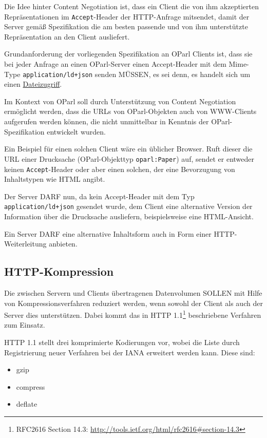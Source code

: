 \documentclass[,a4paper]{article}
\begin{document}
Die Idee hinter Content Negotiation ist, dass ein Client die von ihm
akzeptierten Repräsentationen im \texttt{Accept}-Header der HTTP-Anfrage
mitsendet, damit der Server gemäß Spezifikation die am besten passende
und von ihm unterstützte Repräsentation an den Client ausliefert.

Grundanforderung der vorliegenden Spezifikation an OParl Clients ist,
dass sie bei jeder Anfrage an einen OParl-Server einen Accept-Header mit
dem Mime-Type \texttt{application/ld+json} senden MÜSSEN, es sei denn,
es handelt sich um einen \hyperref[dateizugriff]{Dateizugriff}.

Im Kontext von OParl soll durch Unterstützung von Content Negotiation
ermöglicht werden, dass die URLs von OParl-Objekten auch von WWW-Clients
aufgerufen werden können, die nicht unmittelbar in Kenntnis der
OParl-Spezifikation entwickelt wurden.

Ein Beispiel für einen solchen Client wäre ein üblicher Browser. Ruft
dieser die URL einer Drucksache (OParl-Objekttyp \texttt{oparl:Paper})
auf, sendet er entweder keinen \texttt{Accept}-Header oder aber einen
solchen, der eine Bevorzugung von Inhaltstypen wie HTML angibt.

Der Server DARF nun, da kein Accept-Header mit dem Typ
\texttt{application/ld+json} gesendet wurde, dem Client eine alternative
Version der Information über die Drucksache ausliefern, beispielsweise
eine HTML-Ansicht.

Ein Server DARF eine alternative Inhaltsform auch in Form einer
HTTP-Weiterleitung anbieten.

\subsection{HTTP-Kompression}\label{http-kompression}

Die zwischen Servern und Clients übertragenen Datenvolumen SOLLEN mit
Hilfe von Kompressionsverfahren reduziert werden, wenn sowohl der Client
als auch der Server dies unterstützen. Dabei kommt das in HTTP
1.1\footnote{RFC2616 Section 14.3:
  \url{http://tools.ietf.org/html/rfc2616\#section-14.3}} beschriebene
Verfahren zum Einsatz.

HTTP 1.1 stellt drei komprimierte Kodierungen vor, wobei die Liste durch
Registrierung neuer Verfahren bei der IANA erweitert werden kann. Diese
sind:

\begin{itemize}
\itemsep1pt\parskip0pt
\item
  gzip
\item
  compress
\item
  deflate
\end{itemize}
\end{document}
